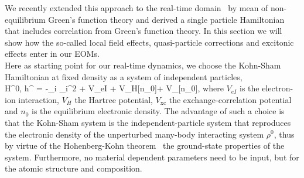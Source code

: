 We recently extended this approach to the real-time domain~\cite{attaccalite} by mean of non-equilibrium Green's function theory and derived a single particle Hamiltonian that includes correlation from Green's function theory. %
In this section we will show how the so-called local field effects, quasi-particle corrections and excitonic effects enter in our EOMs.\\
Here as starting point for our real-time dynamics, we choose the Kohn-Sham  Hamiltonian at fixed density as a system of independent particles,~\cite{PhysRev.140.A1133}  \\
\be
\hat H^{0,} \equiv \hat h^{} = -\sum_{i} \nabla_i^2 + \hat V_{eI} + \hat V_{H}[n_0]+ \hat V_{}[n_0],      
\label{eq:HIPA}
\ee
where $V_{eI}$ is the electron-ion interaction, $V_{H}$ the Hartree potential, $V_{\text{xc}}$ the exchange-correlation potential and $n_0$ is the equilibrium electronic density.
The advantage of such a choice is that the Kohn-Sham system is the independent-particle system that reproduces the electronic density of the unperturbed many-body interacting system $\rho^0$, thus by virtue of the Hohenberg-Kohn theorem~\cite{PhysRev.136.B864} the ground-state properties of the system. Furthermore, no material dependent parameters need to be input, but for the atomic structure and composition. 

